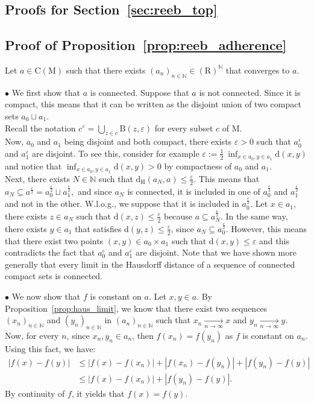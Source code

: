 \documentclass[pdflatex,sn-mathphys-ay]{sn-jnl}%
\newcommand{\reeb}{\mathrm{R}}
\newcommand{\man}{\mathrm{M}}
\newcommand{\dis}{\mathrm{d}}
\newcommand{\comp}{{\mathrm {C}}}
\newcommand{\haus}{{\mathrm {d_H}}}
\newcommand{\ball}{{\mathrm {B}}}
\newcommand{\converge}{\underset{n\rightarrow\infty}{\longrightarrow}}
\newcommand{\N}{\mathbb{N}}
\newcommand{\eps}{\varepsilon}
\newcommand{\change}[1]{\noindent #1}
\theoremstyle{thmstyleone}%
\begin{document}
\begin{appendices}
\section{Proofs for Section~\ref{sec:reeb_top}}\label{apdx:reeb_geom_proofs}
\subsection{Proof of Proposition~\ref{prop:reeb_adherence}}

Let $a\in\comp(\man)$ such that there exists $(a_n)_{n\in\N}\in\left(\reeb\right)^{\N}$ that converges to $a$.

$\bullet$ We first show that $a$ is connected. 
    Suppose that $a$ is not connected. Since it is compact, this means that it can be written as the disjoint union of two compact sets $a_0\sqcup a_1$.\\ \change{Recall the notation $c^\eps=\bigcup_{z\in c}\ball(z,\eps)$ for every subset $c$ of $\man$.}\\  Now, $a_0$ and $a_1$ being disjoint and both compact, there exists $\eps>0$ such that $a_0^\eps$ and $a_1^\eps$ are disjoint. To see this, consider for example $\eps :=\frac{1}{2}\ \inf_{x\in a_0,y\in a_1}\dis(x,y)$  and notice that $\inf_{x\in a_0,y\in a_1}\dis(x,y)>0$ by compactness of $a_0$ and $a_1$. \\
    Next, there exists $N\in\N$ such that $\haus(a_N,a)\leq\frac{\eps}{2}$. This means that 
     $a_N\subseteq a^{\frac{\eps}{2}}=a_0^{\frac{\eps}{2}}\sqcup a_1^{\frac{\eps}{2}},$ 
    and since $a_N$ is connected, it is included in one of $a_0^{\frac{\eps}{2}}$ and $a_1^{\frac{\eps}{2}}$ and not in the other. W.l.o.g.,
    we suppose that it is included in $a_0^{\frac{\eps}{2}}$. 
    Let $x\in a_1$, there exists $z\in a_N$ such that $\dis(x,z)\leq\frac{\eps}{2}$ because $a\subseteq a_N^{\frac{\eps}{2}}$. 
    In the same way, there exists $y\in a_1$ that satisfies $\dis(y,z)\leq\frac{\eps}{2}$, since $a_N\subseteq a_0^{\frac{\eps}{2}}$. 
    However, this means that there exist two points $(x,y)\in a_0\times a_1$ such that $\dis(x,y)\leq \eps$ and this contradicts the fact that $a_0^\eps$ and $a_1^\eps$ are disjoint. Note that we have shown more generally that every limit in the Hausdorff distance  of a sequence of connected compact sets is connected.
    
    
    
$\bullet$ We now show that $f$ is constant on $a$. 
    Let $x,y\in a$. By Proposition~\ref{prop:haus_limit}, we know that there exist two sequences $(x_n)_{n\in\N}$ and $(y_n)_{n\in\N}$ in $(a_n)_{n\in\N}$ such that $x_n\converge x$ and $y_n\converge y$. 
    Now, for every $n$, since  $x_n,y_n\in a_n$, then $f(x_n)=f(y_n)$ as $f$ is constant on $a_n$. Using this fact, we have:
    \begin{align*}
        | f(x)-f(y) |&\leq | f(x)-f(x_n) | + | f(x_n)-f(y_n) |+ | f(y_n)-f(y) |\\
        &\leq | f(x)-f(x_n) | + | f(y_n)-f(y) |.
    \end{align*}
    By continuity of $f$, it yields that $f(x)=f(y)$.

\end{appendices}
\end{document}
